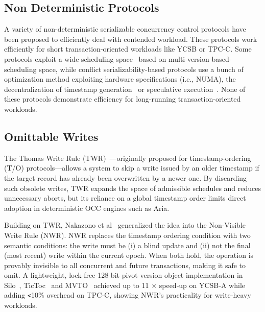 \documentclass[english,preprint,JIP]{ipsj}
\begin{document}
\subsection{Non Deterministic Protocols}
A variety of non-deterministic serializable concurrency control protocols have been proposed to efficiently deal with contended workload.
These protocols work efficiently for short transaction-oriented workloads like YCSB or TPC-C.
%
Some protocols exploit a wide scheduling space~\cite{ermia} based on multi-version based-scheduling space, while conflict serializability-based protocols use a bunch of optimization method exploiting hardware specifications (i.e., NUMA), the decentralization of timestamp generation~\cite{tu2013speedy} or speculative execution~\cite{nakamori2022decentralization,polaris}.
%                                                                       
None of these protocols demonstrate efficiency for long-running transaction-oriented workloads.

\subsection{Omittable Writes}
The Thomas Write Rule (TWR)~\cite{10.1145/320071.320076}—originally proposed for timestamp‑ordering (T/O) protocols—allows a system to skip a write issued by an older timestamp if the target record has already been overwritten by a newer one. By discarding such obsolete writes, TWR expands the space of admissible schedules and reduces unnecessary aborts, but its reliance on a global timestamp order limits direct adoption in deterministic OCC engines such as Aria.

Building on TWR, Nakazono et al~\cite{nakazono2019nwr} generalized the idea into the Non‑Visible Write Rule (NWR). NWR replaces the timestamp ordering condition with two semantic conditions: the write must be (i) a blind update and (ii) not the final (most recent) write within the current epoch. When both hold, the operation is provably invisible to all concurrent and future transactions, making it safe to omit. A lightweight, lock-free 128-bit pivot-version object implementation in Silo~\cite{tu2013speedy}, TicToc~\cite{yu2016tictoc} and MVTO~\cite{lim2017cicada} achieved up to 11 × speed‑up on YCSB‑A while adding \verb|<|10\% overhead on TPC‑C, showing NWR’s practicality for write‑heavy workloads.
\end{document}
